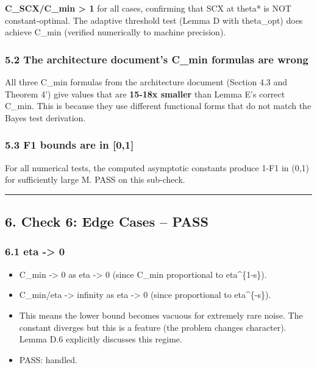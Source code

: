 \documentclass[
  12pt,
]{article}
\providecommand{\tightlist}{%
  \setlength{\itemsep}{0pt}\setlength{\parskip}{0pt}}
\begin{document}
\textbf{C\_SCX/C\_min \textgreater{} 1} for all cases, confirming that
SCX at theta* is NOT constant-optimal. The adaptive threshold test
(Lemma D with theta\_opt) does achieve C\_min (verified numerically to
machine precision).

\subsubsection{5.2 The architecture document's C\_min formulas are
wrong}\label{the-architecture-documents-c_min-formulas-are-wrong}

All three C\_min formulas from the architecture document (Section 4.3
and Theorem 4') give values that are \textbf{15-18x smaller} than Lemma
E's correct C\_min. This is because they use different functional forms
that do not match the Bayes test derivation.

\subsubsection{5.3 F1 bounds are in
{[}0,1{]}}\label{f1-bounds-are-in-01}

For all numerical tests, the computed asymptotic constants produce 1-F1
in (0,1) for sufficiently large M. PASS on this sub-check.

\begin{center}\rule{0.5\linewidth}{0.5pt}\end{center}

\subsection{6. Check 6: Edge Cases --
PASS}\label{check-6-edge-cases-pass}

\subsubsection{6.1 eta -\textgreater{} 0}\label{eta---0}

\begin{itemize}
\tightlist
\item
  C\_min -\textgreater{} 0 as eta -\textgreater{} 0 (since C\_min
  proportional to eta\^{}\{1-s\}).
\item
  C\_min/eta -\textgreater{} infinity as eta -\textgreater{} 0 (since
  proportional to eta\^{}\{-s\}).
\item
  This means the lower bound becomes vacuous for extremely rare noise.
  The constant diverges but this is a feature (the problem changes
  character). Lemma D.6 explicitly discusses this regime.
\item
  PASS: handled.
\end{itemize}
\end{document}
